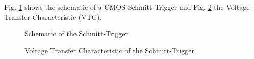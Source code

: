 \documentclass{article}[11pt]
\begin{document}
\notetitle

\cite{wang-schmitttrigger-91,filanovsky-schmitttrigger-94,melek-schmitttrigger-17}

Fig. \ref{fig:schmitt-trigger} shows the schematic of a CMOS Schmitt-Trigger
and Fig. \ref{fig:vtc} the Voltage Transfer Characteristic (VTC).

\begin{figure}[H]
  \centering
  \begin{circuitikz}
    
  \end{circuitikz}
  \caption{Schematic of the Schmitt-Trigger}
  \label{fig:schmitt-trigger}
\end{figure}

\begin{figure}[H]
  \centering
  \begin{tikzpicture}
    
  \end{tikzpicture}
  \caption{Voltage Transfer Characteristic of the Schmitt-Trigger}
  \label{fig:vtc}
\end{figure}
\end{document}
